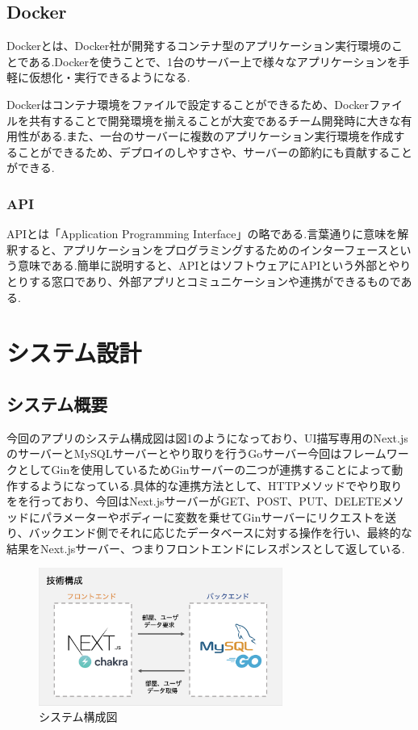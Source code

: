 \documentclass[submit,techrep]{ipsj}
\begin{document}
\subsection{Docker}
Dockerとは、Docker社が開発するコンテナ型のアプリケーション実行環境のことである.Dockerを使うことで、1台のサーバー上で様々なアプリケーションを手軽に仮想化・実行できるようになる.

Dockerはコンテナ環境をファイルで設定することができるため、Dockerファイルを共有することで開発環境を揃えることが大変であるチーム開発時に大きな有用性がある.また、一台のサーバーに複数のアプリケーション実行環境を作成することができるため、デプロイのしやすさや、サーバーの節約にも貢献することができる.

\subsubsection{API}
APIとは「Application Programming Interface」の略である.言葉通りに意味を解釈すると、アプリケーションをプログラミングするためのインターフェースという意味である.簡単に説明すると、APIとはソフトウェアにAPIという外部とやりとりする窓口であり、外部アプリとコミュニケーションや連携ができるものである.

\section{システム設計}

\subsection{システム概要}
今回のアプリのシステム構成図は図1のようになっており、UI描写専用のNext.jsのサーバーとMySQLサーバーとやり取りを行うGoサーバー今回はフレームワークとしてGinを使用しているためGinサーバーの二つが連携することによって動作するようになっている.具体的な連携方法として、HTTPメソッドでやり取りをを行っており、今回はNext.jsサーバーがGET、POST、PUT、DELETEメソッドにパラメーターやボディーに変数を乗せてGinサーバーにリクエストを送り、バックエンド側でそれに応じたデータベースに対する操作を行い、最終的な結果をNext.jsサーバー、つまりフロントエンドにレスポンスとして返している.

\begin{figure}[htbp]
  \centering
 \includegraphics[width=8cm]{./images/technical_configuration.jpg}
  \caption{システム構成図}
  \label{fig:sample}
\end{figure}
\end{document}
